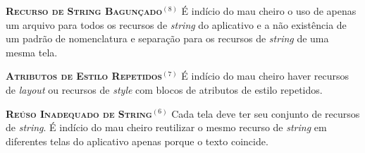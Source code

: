   \noindent
  \textbf{\textsc{{\small Recurso de String Bagunçado}}}$^{(8)}$
      É indício do mau cheiro o uso de apenas um arquivo para todos os recursos de \textit{string} do aplicativo e a não existência de um padrão de nomenclatura e separação para os recursos de \textit{string} de uma mesma tela.


  \noindent
  \textbf{\textsc{{\small Atributos de Estilo Repetidos}}}$^{(7)}$
      É indício do mau cheiro haver recursos de \textit{layout} ou recursos de \textit{style} com blocos de atributos de estilo repetidos.


  \noindent
  \textbf{\textsc{{\small Reúso Inadequado de String}}}$^{(6)}$
      Cada tela deve ter seu conjunto de recursos de \textit{string}. É indício do mau cheiro reutilizar o mesmo recurso de \textit{string} em diferentes telas do aplicativo apenas porque o texto coincide.


